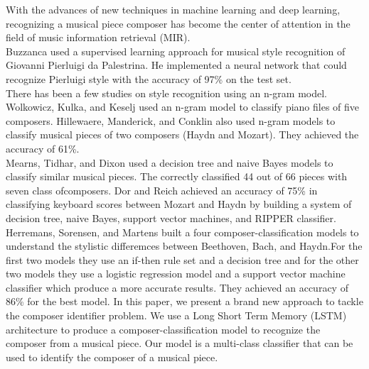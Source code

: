 \documentclass[11pt,a4paper]{article}
\begin{document}
With the advances of new techniques in machine learning and deep learning, recognizing a musical piece composer has become the center of attention in the field of music information retrieval (MIR).\\
Buzzanca \cite{Buzz} used a supervised learning approach for musical style recognition of Giovanni Pierluigi da Palestrina. He implemented a neural network that could recognize Pierluigi style with the accuracy of 97\% on the test set. \\
There has been a few studies on style recognition using an n-gram model. Wolkowicz, Kulka, and Keselj \cite{n-gram} used an n-gram model to classify piano files of five composers.  Hillewaere, Manderick, and Conklin \cite{Hillewaere} also used n-gram models to classify musical pieces of two composers (Haydn and Mozart). They achieved the accuracy of 61\%.\\ 
Mearns, Tidhar, and Dixon \cite{Mearns} used a decision tree and naive Bayes models to classify similar musical pieces. The correctly classified 44 out of 66 pieces with seven class ofcomposers. Dor and Reich \cite{Dor} achieved an accuracy of 75\% in classifying keyboard scores between Mozart and Haydn by building a system of decision tree, naive Bayes, support vector machines, and RIPPER classifier. \\
Herremans, Sorensen, and Martens \cite {Herremans} built a four composer-classification models to understand the stylistic differemces between Beethoven, Bach, and Haydn.For the first two models they use an if-then rule set and a decision tree and for the other two models they use a logistic regression model and a support vector machine classifier which produce a more accurate results. They achieved an accuracy of 86\% for the best model. 
In this paper, we present a brand new approach to tackle the composer identifier problem. We use a Long Short Term Memory (LSTM) architecture to produce a composer-classification model to recognize the composer from a musical piece. Our model is a multi-class classifier that can be used to identify the composer of a musical piece. 
\end{document}
